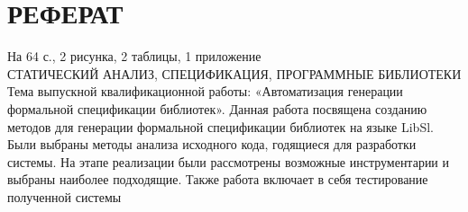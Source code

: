 \chapter*{РЕФЕРАТ}
\thispagestyle{empty}

На 64 с., 2 рисунка, 2 таблицы, 1 приложение \\

СТАТИЧЕСКИЙ АНАЛИЗ, СПЕЦИФИКАЦИЯ, ПРОГРАММНЫЕ БИБЛИОТЕКИ \\

Тема выпускной квалификационной работы: «Автоматизация генерации формальной спецификации библиотек».
Данная работа посвящена созданию методов для генерации формальной спецификации библиотек на языке LibSl.
Были выбраны методы анализа исходного кода, годящиеся для разработки системы.
На этапе реализации были рассмотрены возможные инструментарии и выбраны наиболее подходящие.
Также работа включает в себя тестирование полученной системы